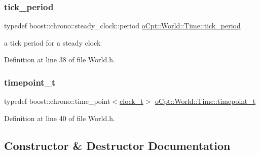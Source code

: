 \hypertarget{classo_cpt_1_1_world_1_1_time_a8191b46c075d8d9ec6db0588797b59a5}{}\label{classo_cpt_1_1_world_1_1_time_a8191b46c075d8d9ec6db0588797b59a5} 
\subsubsection{\texorpdfstring{tick\+\_\+period}{tick\_period}}
{\footnotesize\ttfamily typedef boost\+::chrono\+::steady\+\_\+clock\+::period \hyperlink{classo_cpt_1_1_world_1_1_time_a8191b46c075d8d9ec6db0588797b59a5}{o\+Cpt\+::\+World\+::\+Time\+::tick\+\_\+period}}



a tick period for a steady clock 



Definition at line 38 of file World.\+h.

\hypertarget{classo_cpt_1_1_world_1_1_time_a6a6e782c3c90622c1c7070b0a223ec4c}{}\label{classo_cpt_1_1_world_1_1_time_a6a6e782c3c90622c1c7070b0a223ec4c} 
\subsubsection{\texorpdfstring{timepoint\+\_\+t}{timepoint\_t}}
{\footnotesize\ttfamily typedef boost\+::chrono\+::time\+\_\+point$<$\hyperlink{classo_cpt_1_1_world_1_1_time_ac41de01610f32d0ace4844ed3bf454f7}{clock\+\_\+t}$>$ \hyperlink{classo_cpt_1_1_world_1_1_time_a6a6e782c3c90622c1c7070b0a223ec4c}{o\+Cpt\+::\+World\+::\+Time\+::timepoint\+\_\+t}}



Definition at line 40 of file World.\+h.



\subsection{Constructor \& Destructor Documentation}
\hypertarget{classo_cpt_1_1_world_1_1_time_a831b0a1d8bd9ebe4ebe0111bd4516eb5}{}\label{classo_cpt_1_1_world_1_1_time_a831b0a1d8bd9ebe4ebe0111bd4516eb5} 
